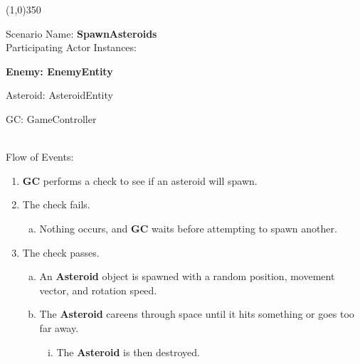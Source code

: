 \documentclass[12pt]{article}       %
\begin{document}
\begin{center} \line(1,0){350} \end{center}
Scenario Name: {\bf SpawnAsteroids} \\
Participating Actor Instances:        \hspace{46pt} {\bf Enemy: EnemyEntity

						\hspace{2.6 in} Asteroid: AsteroidEntity

						\hspace{2.6 in}  GC: GameController}  \vspace{10pt}  \\ 
Flow of Events: 
\begin{enumerate} 
\item {\bf GC} performs a check to see if an asteroid will spawn.
\item The check fails.
	\begin{enumerate} [a.]
	\item Nothing occurs, and {\bf GC} waits before attempting to spawn another.
	\end{enumerate}
\item The check passes.
	\begin{enumerate} [a.]
	\item An {\bf Asteroid} object is spawned with a random position, movement vector, and rotation speed.
	\item The {\bf Asteroid} careens through space until it hits something or goes too far away.
		\begin{enumerate} [i.]
		\item The {\bf Asteroid} is then destroyed.
		\end{enumerate}
	\end{enumerate}
\end{enumerate}
\end{document}
